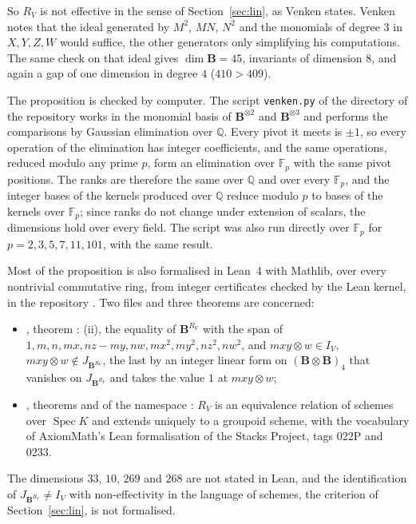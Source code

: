 \documentclass[11pt,a4paper]{amsart}
\theoremstyle{remark}
\newcommand{\F}{\mathbb F}
\newcommand{\Q}{\mathbb Q}
\begin{document}
So $R_V$ is not effective in the sense of Section~\ref{sec:lin}, as Venken states. Venken notes that the ideal generated by $M^2$, $MN$, $N^2$ and the monomials of degree $3$ in $X, Y, Z, W$ would suffice, the other generators only simplifying his computations. The same check on that ideal gives $\dim \mathbf B = 45$, invariants of dimension $8$, and again a gap of one dimension in degree $4$ ($410 > 409$).

The proposition is checked by computer. The script \texttt{venken.py} of the directory  of the repository \cite{repo} works in the monomial basis of $\mathbf B^{\otimes 2}$ and $\mathbf B^{\otimes 3}$ and performs the comparisons by Gaussian elimination over $\Q$. Every pivot it meets is $\pm 1$, so every operation of the elimination has integer coefficients, and the same operations, reduced modulo any prime $p$, form an elimination over $\F_p$ with the same pivot positions. The ranks are therefore the same over $\Q$ and over every $\F_p$, and the integer bases of the kernels produced over $\Q$ reduce modulo $p$ to bases of the kernels over $\F_p$; since ranks do not change under extension of scalars, the dimensions hold over every field. The script was also run directly over $\F_p$ for $p = 2, 3, 5, 7, 11, 101$, with the same result.

Most of the proposition is also formalised in Lean~4 with Mathlib, over every nontrivial commutative ring, from integer certificates checked by the Lean kernel, in the repository \cite{leanrepo}. Two files and three theorems are concerned:
\begin{itemize}\raggedright
\item {}, theorem : (ii), the equality of $\mathbf B^{R_V}$ with the span of $1, m, n, mx, nz - my, nw, mx^2, my^2, nz^2, nw^2$, and $mxy \otimes w \in I_V$, $mxy \otimes w \notin J_{\mathbf B^{R_V}}$, the last by an integer linear form on $(\mathbf B \otimes \mathbf B)_4$ that vanishes on $J_{\mathbf B^{R_V}}$ and takes the value $1$ at $mxy \otimes w$;
\item {}, theorems  and  of the namespace : $R_V$ is an equivalence relation of schemes over $\operatorname{Spec} K$ and extends uniquely to a groupoid scheme, with the vocabulary of AxiomMath's Lean formalisation of the Stacks Project, tags 022P and 0233.
\end{itemize}
The dimensions $33$, $10$, $269$ and $268$ are not stated in Lean, and the identification of $J_{\mathbf B^{R_V}} \ne I_V$ with non-effectivity in the language of schemes, the criterion of Section~\ref{sec:lin}, is not formalised.
\end{document}
